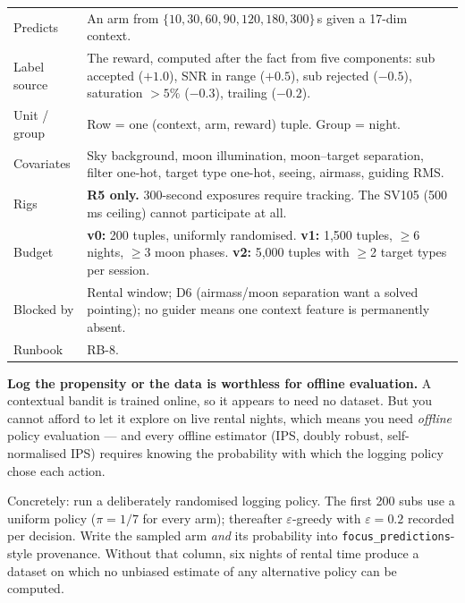 \documentclass[11pt]{article}
\newcommand{\co}[1]{\texttt{\small #1}}
\begin{document}
\begin{center}
\small
\begin{tabular}{@{}p{}p{}@{}}
\toprule
Predicts & An arm from $\{10, 30, 60, 90, 120, 180, 300\}$\,s given a 17-dim context. \\
Label source & The reward, computed after the fact from five components: sub accepted ($+1.0$), SNR in range ($+0.5$), sub rejected ($-0.5$), saturation $>5\%$ ($-0.3$), trailing ($-0.2$). \\
Unit / group & Row = one (context, arm, reward) tuple. Group = night. \\
Covariates & Sky background, moon illumination, moon--target separation, filter one-hot, target type one-hot, seeing, airmass, guiding RMS. \\
Rigs & \textbf{R5 only.} 300-second exposures require tracking. The SV105 (500\,ms ceiling) cannot participate at all. \\
Budget & \textbf{v0:} 200 tuples, uniformly randomised. \textbf{v1:} 1,500 tuples, $\geq$6 nights, $\geq$3 moon phases. \textbf{v2:} 5,000 tuples with $\geq$2 target types per session. \\
Blocked by & Rental window; D6 (airmass/moon separation want a solved pointing); no guider means one context feature is permanently absent. \\
Runbook & RB-8. \\
\bottomrule
\end{tabular}
\end{center}

\begin{redbox}
\textbf{Log the propensity or the data is worthless for offline evaluation.}
A contextual bandit is trained online, so it appears to need no dataset. But you
cannot afford to let it explore on live rental nights, which means you need
\emph{offline} policy evaluation --- and every offline estimator (IPS, doubly
robust, self-normalised IPS) requires knowing the probability with which the
logging policy chose each action.

Concretely: run a deliberately randomised logging policy. The first 200 subs
use a uniform policy ($\pi = 1/7$ for every arm); thereafter $\varepsilon$-greedy
with $\varepsilon = 0.2$ recorded per decision. Write the sampled arm
\emph{and} its probability into \co{focus\_predictions}-style provenance.
Without that column, six nights of rental time produce a dataset on which no
unbiased estimate of any alternative policy can be computed.
\end{redbox}
\end{document}
